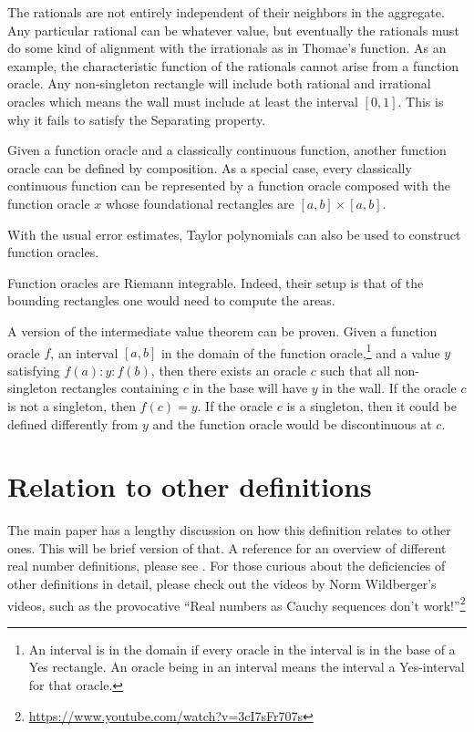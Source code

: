 \documentclass[12pt]{article}
\theoremstyle{remark}
\begin{document}
The rationals are not entirely independent of their neighbors in the aggregate. Any particular rational can be whatever value, but eventually the rationals must do some kind of alignment with the irrationals as in Thomae's function. As an example, the characteristic function of the rationals cannot arise from a function oracle. Any non-singleton rectangle will include both rational and irrational oracles which means the wall must include at least the interval $[0,1]$. This is why it fails to satisfy the Separating property. 

Given a function oracle and a classically continuous function, another function oracle can be defined by composition. As a special case, every classically continuous function can be represented by a function oracle composed with the function oracle $x$ whose foundational rectangles are $[a,b] \times [a,b]$.

With the usual error estimates, Taylor polynomials can also be used to construct function oracles. 

Function oracles are Riemann integrable. Indeed, their setup is that of the bounding rectangles one would need to compute the areas. 

A version of the intermediate value theorem can be proven. Given a function oracle $f$, an interval $[a,b]$ in the domain of the function oracle,\footnote{An interval is in the domain if every oracle in the interval is in the base of a Yes rectangle. An oracle being in an interval means the interval a Yes-interval for that oracle.} and a value $y$ satisfying $f(a):y:f(b)$, then there exists an oracle $c$ such that all non-singleton rectangles containing $c$ in the base will have $y$ in the wall. If the oracle $c$ is not a singleton, then $f(c) = y$. If the oracle $c$ is a singleton, then it could be defined differently from $y$ and the function oracle would be discontinuous at $c$. 

\section{Relation to other definitions}

The main paper has a lengthy discussion on how this definition relates to other ones. This will be brief version of that. A reference for an overview of different real number definitions, please see \cite{ittay-2015}. For those curious about the deficiencies of other definitions in detail, please check out the videos by Norm Wildberger's videos, such as the provocative ``Real numbers as Cauchy sequences don't work!''\footnote{\url{https://www.youtube.com/watch?v=3cI7sFr707s}}
\end{document}
